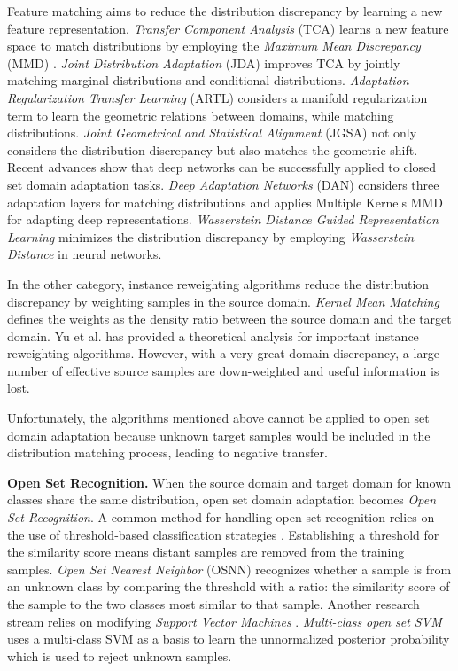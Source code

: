 \documentclass[journal]{IEEEtran}
\begin{document}
Feature matching aims to reduce the distribution discrepancy by learning a new feature representation. \textit{Transfer Component Analysis} (TCA) \cite{pan2011domain} learns a new feature space to match distributions by employing the \textit{Maximum Mean Discrepancy} (MMD) \cite{gretton2012kernel}. \textit{Joint Distribution Adaptation} (JDA) \cite{long2013transfer} improves TCA by jointly matching marginal distributions and conditional distributions. \textit{Adaptation Regularization
Transfer Learning} (ARTL) \cite{DBLP:journals/tkde/LongWDPY14} considers a manifold regularization term \cite{DBLP:journals/jmlr/BelkinNS06} to learn the geometric relations between domains, while matching distributions. \textit{Joint Geometrical and Statistical Alignment} (JGSA) \cite{DBLP:conf/cvpr/ZhangLO17} not only considers the distribution discrepancy but also matches the geometric shift. Recent advances show that deep networks can be successfully applied to closed set domain adaptation tasks.  \textit{Deep Adaptation Networks} (DAN) \cite{long2015learning} considers three adaptation layers for matching distributions and applies Multiple Kernels MMD \cite{gretton2012optimal} for adapting deep representations. \textit{Wasserstein Distance Guided Representation Learning} \cite{shen2018wasserstein} minimizes the distribution discrepancy by employing \textit{Wasserstein Distance} in neural networks. 

In the other category, instance reweighting algorithms reduce the distribution discrepancy by weighting samples in the source domain. \textit{Kernel Mean Matching} \cite{huang2007correcting} defines the weights as the density ratio between the source domain and the target domain. Yu et al. \cite{yu2012analysis} has provided a theoretical analysis for important instance reweighting algorithms. However, with a very great domain discrepancy, a large number of effective source samples are down-weighted and useful information is lost.

Unfortunately, the algorithms mentioned above cannot be applied to open set domain adaptation because unknown target samples would be included in the distribution matching process, leading to negative transfer.


\textbf{Open Set Recognition.} When the source domain and target domain for known classes share the same distribution, open set domain adaptation becomes \textit{Open Set Recognition}. A common method for handling open set recognition relies on the use of threshold-based classification strategies \cite{DBLP:books/daglib/p/PhillipsGM11}. Establishing a threshold for the similarity score means distant samples are removed from the training samples.  \textit{Open Set Nearest Neighbor} (OSNN) \cite{DBLP:journals/ml/Mendes-JuniorSW17} recognizes whether a sample is from an unknown class by comparing the threshold with a ratio: the similarity score of the sample to the two classes most similar to that sample. Another research stream relies on modifying \textit{Support Vector Machines}  \cite{DBLP:journals/pami/ScheirerJB14,DBLP:conf/icb/VaretoSCS17,DBLP:conf/eccv/JainSB14}. \textit{Multi-class open set SVM} \cite{DBLP:conf/eccv/JainSB14} uses a multi-class SVM as a basis to learn the unnormalized posterior probability which is used to reject unknown samples.
\end{document}
